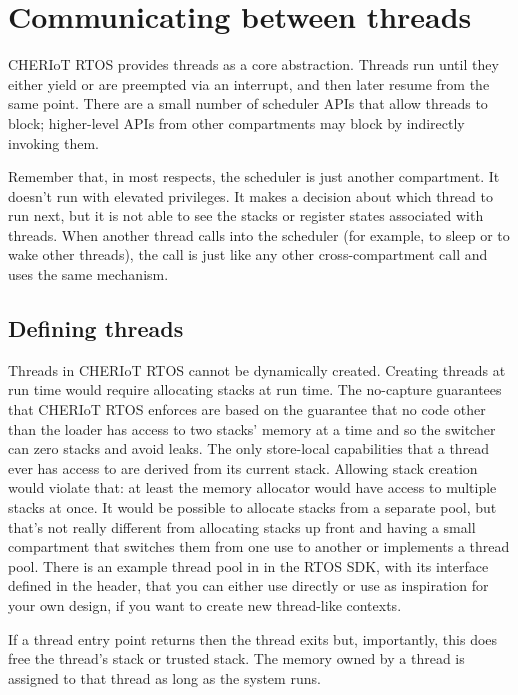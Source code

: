 \chapter[label=threads]{Communicating between threads}

CHERIoT RTOS provides threads as a core abstraction.
Threads run until they either yield or are preempted via an interrupt, and then later resume from the same point.
There are a small number of scheduler APIs that allow threads to block; higher-level APIs from other compartments may block by indirectly invoking them.

Remember that, in most respects, the scheduler is just another compartment.
It doesn't run with elevated privileges. It makes a decision about which thread to run next, but it is not able to see the stacks or register states associated with threads.
When another thread calls into the scheduler (for example, to sleep or to wake other threads), the call is just like any other cross-compartment call and uses the same mechanism.

\section{Defining threads}

Threads in CHERIoT RTOS cannot be dynamically created.
Creating threads at run time would require allocating stacks at run time.
The no-capture guarantees that CHERIoT RTOS enforces are based on the guarantee that no code other than the loader has access to two stacks' memory at a time and so the switcher can zero stacks and avoid leaks.
The only store-local capabilities that a thread ever has access to are derived from its current stack.
Allowing stack creation would violate that: at least the memory allocator would have access to multiple stacks at once.
It would be possible to allocate stacks from a separate pool, but that's not really different from allocating stacks up front and having a small compartment that switches them from one use to another or implements a thread pool.
There is an example thread pool in  in the RTOS SDK, with its interface defined in the  header, that you can either use directly or use as inspiration for your own design, if you want to create new thread-like contexts.

If a thread entry point returns then the thread exits but, importantly, this does  free the thread's stack or trusted stack.
The memory owned by a thread is assigned to that thread as long as the system runs.

